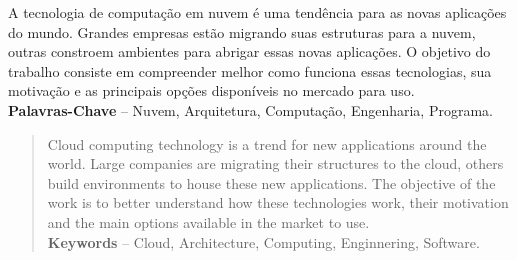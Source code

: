 \documentclass[]{politex}
\begin{document}
\capa
\falsafolhaderosto
\folhaderosto














\begin{resumo}
A tecnologia de computação em nuvem é uma tendência para as novas aplicações do mundo. Grandes empresas estão migrando suas estruturas para a nuvem, outras constroem ambientes para abrigar essas novas aplicações. O objetivo do trabalho consiste em compreender melhor como funciona essas tecnologias, sua motivação e as principais opções disponíveis no mercado para uso.
%
\\[3\baselineskip]
%
\textbf{Palavras-Chave} -- Nuvem, Arquitetura, Computação, Engenharia, Programa.
\end{resumo}


\begin{abstract}
Cloud computing technology is a trend for new applications around the world. Large companies are migrating their structures to the cloud, others build environments to house these new applications. The objective of the work is to better understand how these technologies work, their motivation and the main options available in the market to use.
%
\\[3\baselineskip]
%
\textbf{Keywords} -- Cloud, Architecture, Computing, Enginnering, Software.
\end{abstract}
\end{document}
